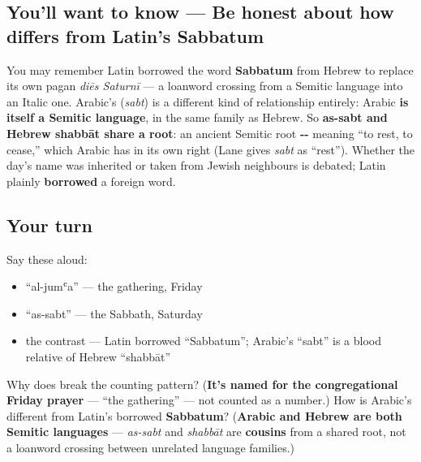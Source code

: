 \subsection*{You'll want to know — Be honest about how  differs from Latin's Sabbatum}
You may remember Latin borrowed the word \textbf{Sabbatum} from Hebrew to replace its own pagan \emph{diēs Saturnī} — a loanword crossing from a Semitic language into an Italic one. Arabic's \textbf{} (\emph{sabt}) is a different kind of relationship entirely: Arabic \textbf{is itself a Semitic language}, in the same family as Hebrew. So \textbf{as-sabt and Hebrew shabbāt share a root}: an ancient Semitic root \textbf{--} meaning \textquotedblleft{}to rest, to cease,\textquotedblright{} which Arabic has in its own right (Lane gives \emph{sabt} as \textquotedblleft{}rest\textquotedblright{}). Whether the day's name was inherited or taken from Jewish neighbours is debated; Latin plainly \textbf{borrowed} a foreign word.

\subsection*{Your turn}
Say these aloud:

\begin{itemize}
\raggedright
  \item \textquotedblleft{}al-jumʿa\textquotedblright{} — the gathering, Friday
  \item \textquotedblleft{}as-sabt\textquotedblright{} — the Sabbath, Saturday
  \item the contrast — Latin borrowed \textquotedblleft{}Sabbatum\textquotedblright{}; Arabic's \textquotedblleft{}sabt\textquotedblright{} is a blood relative of Hebrew \textquotedblleft{}shabbāt\textquotedblright{}
\end{itemize}

\begin{tcolorbox}[breakable,colback=teal!4,colframe=teal!35!black,title={Before you move on}]
Why does \textbf{} break the counting pattern? (\textbf{It's named for the congregational Friday prayer} — \textquotedblleft{}the gathering\textquotedblright{} — not counted as a number.) How is Arabic's \textbf{} different from Latin's borrowed \textbf{Sabbatum}? (\textbf{Arabic and Hebrew are both Semitic languages} — \emph{as-sabt} and \emph{shabbāt} are \textbf{cousins} from a shared root, not a loanword crossing between unrelated language families.)
\end{tcolorbox}
